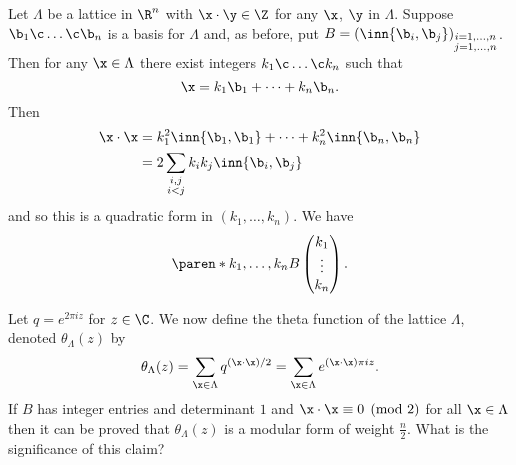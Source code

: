 Let $\Lambda$ be a lattice in $\R^n$ with $\x\cdot\y\in\Z$ for any $\x$, $\y$ in $\Lambda$.  Suppose $\b_1\c \dotsc\c \b_n$ is a basis for $\Lambda$ and, as before, put $B=(\inn{\b_i,\b_j})_{\substack{i=1,\dotsc,n\\j=1,\dotsc,n}}$.  Then for any $\x\in\Lambda$ there exist integers $k_1\c \dotsc\c k_n$ such that
\[ \x = k_1\b_1 + \dotsb + k_n\b_n . \]
Then
\begin{align*}
\x\cdot\x &= k_1^2\inn{\b_1,\b_1} + \dotsb + k_n^2 \inn{\b_n,\b_n} \\
&= 2 \sum_{\substack{i,j\\i<j}} k_ik_j \inn{\b_i,\b_j}
\end{align*}
and so this is a quadratic form in $(k_1,\dotsc,k_n)$.  We have
\[ \paren*{k_1,\dotsc,k_n} B \begin{pmatrix}k_1\\\vdots\\k_n\end{pmatrix} . \]

Let $q=e^{2\pi i z}$ for $z\in\C$.  We now define the theta function of the lattice $\Lambda$, denoted $\theta_\Lambda(z)$ by
\[ \theta_\Lambda(z) = \sum_{\x\in\Lambda} q^{(\x\cdot\x)/2} = \sum_{\x\in\Lambda} e^{(\x\cdot\x)\pi iz} . \]
If $B$ has integer entries and determinant $1$ and $\x\cdot\x\equiv0\pmod2$ for all $\x\in\Lambda$ then it can be proved that $\theta_\Lambda(z)$ is a modular form of weight $\frac n2$.  What is the significance of this claim?
